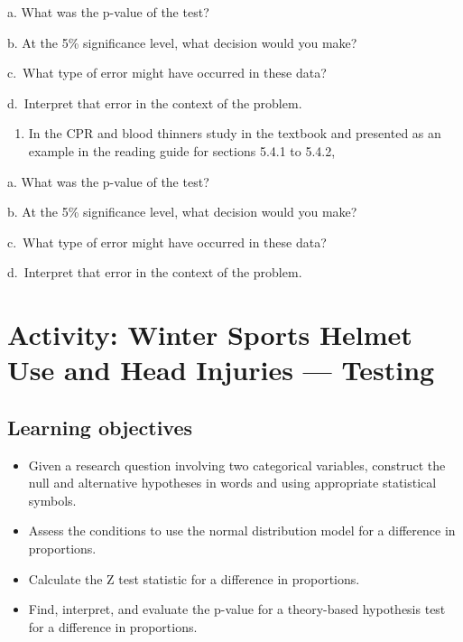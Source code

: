 \documentclass[
]{report}
\providecommand{\tightlist}{%
  \setlength{\itemsep}{0pt}\setlength{\parskip}{0pt}}
\newcommand{\rgs}{\vspace{12pt}} %
\newcommand{\rgi}{\hspace{24pt}}  %
\begin{document}
\rgi a. What was the p-value of the test?
\rgs

\rgi b. At the 5\% significance level, what decision would you make?
\rgs

\rgi c.~What type of error might have occurred in these data?
\rgs

\rgi d.~Interpret that error in the context of the problem.
\rgs
\rgs

\begin{enumerate}
\def\labelenumi{\arabic{enumi}.}
\setcounter{enumi}{2}
\tightlist
\item
  In the CPR and blood thinners study in the textbook and presented as an example in the reading guide for sections 5.4.1 to 5.4.2,
\end{enumerate}

\rgi a. What was the p-value of the test?
\rgs

\rgi b. At the 5\% significance level, what decision would you make?
\rgs

\rgi c.~What type of error might have occurred in these data?
\rgs

\rgi d.~Interpret that error in the context of the problem.
\rgs
\rgs

\newpage

\hypertarget{activity-winter-sports-helmet-use-and-head-injuries-testing}{%
\section{Activity: Winter Sports Helmet Use and Head Injuries --- Testing}\label{activity-winter-sports-helmet-use-and-head-injuries-testing}}


\hypertarget{learning-objectives-4}{%
\subsection{Learning objectives}\label{learning-objectives-4}}

\begin{itemize}
\item
  Given a research question involving two categorical variables, construct the null and alternative hypotheses
  in words and using appropriate statistical symbols.
\item
  Assess the conditions to use the normal distribution model for a difference in proportions.
\item
  Calculate the Z test statistic for a difference in proportions.
\item
  Find, interpret, and evaluate the p-value for a theory-based hypothesis test for a difference in proportions.
\end{itemize}
\end{document}
